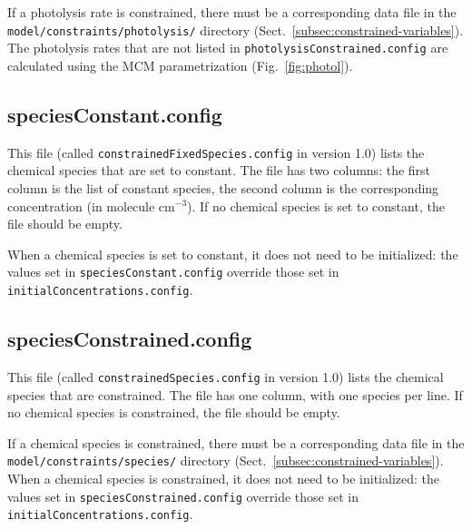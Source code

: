 If a photolysis rate is constrained, there must be a corresponding
data file in the \texttt{model/constraints/photolysis/} directory
(Sect.~\ref{subsec:constrained-variables}). The photolysis rates that
are not listed in \texttt{photolysisConstrained.config} are calculated
using the MCM parametrization (Fig.~\ref{fig:photol}).

\subsection{speciesConstant.config} \label{subsec:speciesconstant}

This file (called \texttt{constrainedFixedSpecies.config} in version 1.0)
lists the chemical species that are set to constant. The file has two
columns: the first column is the list of constant species, the second
column is the corresponding concentration (in molecule cm$^{-3}$).
If no chemical species is set to constant, the file should be
empty.

When a chemical species is set to constant, it does not need to be
initialized: the values set in \texttt{speciesConstant.config}
override those set in \texttt{initialConcentrations.config}.

\subsection{speciesConstrained.config} \label{subsec:speciesconstrained}

This file (called \texttt{constrainedSpecies.config} in version 1.0) lists
the chemical species that are constrained. The file has one column,
with one species per line. If no chemical species is constrained, the
file should be empty.

If a chemical species is constrained, there must be a corresponding
data file in the \texttt{model/constraints/species/} directory
(Sect.~\ref{subsec:constrained-variables}). When a chemical species is
constrained, it does not need to be initialized: the values set in
\texttt{speciesConstrained.config} override those set in
\texttt{initialConcentrations.config}.
